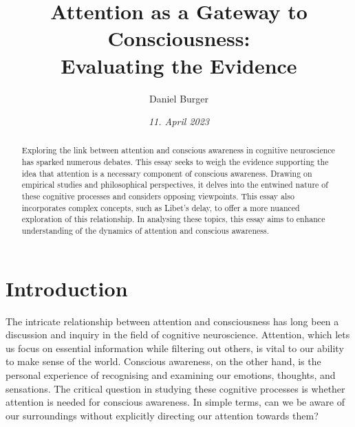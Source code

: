 \documentclass[10pt]{article}
\title{\textbf{Attention as a Gateway to Consciousness:} \\ Evaluating the Evidence}
\author[ ]{Daniel Burger}
\affil[ ]{\textbf{King’s College London}}
\affil[ ]{\href{mailto:daniel.burger@kcl.ac.uk}{daniel.burger@kcl.ac.uk}}
\date{\textit{11. April 2023}}
\begin{document}

\maketitle
\thispagestyle{empty}

\begin{sloppypar} %
  \begin{abstract}
    Exploring the link between attention and conscious awareness in cognitive neuroscience has sparked numerous debates. This essay seeks to weigh the evidence supporting the idea that attention is a necessary component of conscious awareness. Drawing on empirical studies and philosophical perspectives, it delves into the entwined nature of these cognitive processes and considers opposing viewpoints. This essay also incorporates complex concepts, such as  Libet’s delay, to offer a more nuanced exploration of this relationship. In analysing these topics, this essay aims to enhance understanding of the dynamics of attention and conscious awareness.

  \end{abstract}
  \pagebreak

  \tableofcontents
  \pagebreak

  \listoffigures
  \pagebreak

  \listoftables
  \pagebreak


  \doublespacing

  \section{Introduction}
  \label{sec:introduction}

  The intricate relationship between attention and consciousness has long been a discussion and inquiry in the field of cognitive neuroscience. Attention, which lets us focus on essential information while filtering out others, is vital to our ability to make sense of the world. Conscious awareness, on the other hand, is the personal experience of recognising and examining our emotions, thoughts, and sensations. The critical question in studying these cognitive processes is whether attention is needed for conscious awareness. In simple terms, can we be aware of our surroundings without explicitly directing our attention towards them?


\end{sloppypar}
\end{document}
